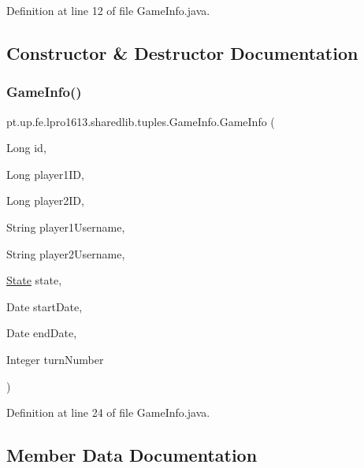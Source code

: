 Definition at line 12 of file Game\+Info.\+java.



\subsection{Constructor \& Destructor Documentation}
\hypertarget{classpt_1_1up_1_1fe_1_1lpro1613_1_1sharedlib_1_1tuples_1_1_game_info_a559fea322ea2448e70afcfc452c4792b}{}\label{classpt_1_1up_1_1fe_1_1lpro1613_1_1sharedlib_1_1tuples_1_1_game_info_a559fea322ea2448e70afcfc452c4792b} 
\subsubsection{\texorpdfstring{Game\+Info()}{GameInfo()}}
{\footnotesize\ttfamily pt.\+up.\+fe.\+lpro1613.\+sharedlib.\+tuples.\+Game\+Info.\+Game\+Info (\begin{DoxyParamCaption}\item[{Long}]{id,  }\item[{Long}]{player1\+ID,  }\item[{Long}]{player2\+ID,  }\item[{String}]{player1\+Username,  }\item[{String}]{player2\+Username,  }\item[{\hyperlink{enumpt_1_1up_1_1fe_1_1lpro1613_1_1sharedlib_1_1tuples_1_1_game_info_1_1_state}{State}}]{state,  }\item[{Date}]{start\+Date,  }\item[{Date}]{end\+Date,  }\item[{Integer}]{turn\+Number }\end{DoxyParamCaption})}



Definition at line 24 of file Game\+Info.\+java.



\subsection{Member Data Documentation}
\hypertarget{classpt_1_1up_1_1fe_1_1lpro1613_1_1sharedlib_1_1tuples_1_1_game_info_acdcfafc4db0d610fe2112364076f4518}{}\label{classpt_1_1up_1_1fe_1_1lpro1613_1_1sharedlib_1_1tuples_1_1_game_info_acdcfafc4db0d610fe2112364076f4518} 
